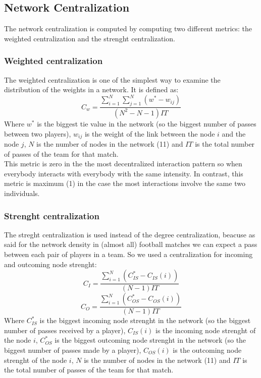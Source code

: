 \documentclass[12pt, a4paper]{article}
\begin{document}
\subsection{Network Centralization}
The network centralization is computed by computing two different metrics: the weighted centralization and the strenght centralization. \\
\subsubsection{Weighted centralization}
The weighted centralization is one of the simplest way to examine the distribution of the weights in a network. It is defined as:
$$C_w = \frac{\sum^N_{i=1} \sum^N_{j=1} (w^* - w_{ij})}{(N^2 - N - 1)IT}$$
Where $w^*$ is the biggest tie value in the network (so the biggest number of passes between two players), $w_{ij}$ is the weight of the link between the node $i$ and the node $j$, $N$ is the number of nodes in the network (11) and $IT$ is the total number of passes of the team for that match. \\
This metric is zero in the  the most decentralized interaction pattern so when everybody interacts with everybody with the same intensity. In contrast, this metric is maximum (1) in the case the  most interactions involve the same two individuals. 
\subsubsection{Strenght centralization}
The streght centralization is used instead of the degree centralization, beacuse as said for the network density in (almost all) football matches we can expect a pass between each pair of players in a team. So we used a centralization for incoming and outcoming node strenght: 
$$C_I = \frac{\sum^N_{i=1}(C_{IS}^* - C_{IS}(i))}{(N - 1)IT}$$
$$C_O = \frac{\sum^N_{i=1}(C_{OS}^* - C_{OS}(i))}{(N - 1)IT}$$
Where $C_{IS}^*$ is the biggest incoming node strenght in the network (so the biggest number of passes received by a player), $C_{IS}(i)$ is the incoming node strenght of the node $i$, $C_{OS}^*$ is the biggest outcoming node strenght in the network (so the biggest number of passes made by a player), $C_{OS}(i)$ is the outcoming node strenght of the node $i$, $N$ is the number of nodes in the network (11) and $IT$ is the total number of passes of the team for that match. \\


\end{document}
